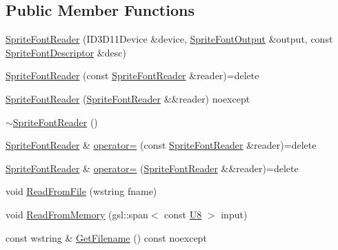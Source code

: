 \subsection*{Public Member Functions}
\begin{DoxyCompactItemize}
\item 
\mbox{\hyperlink{classmage_1_1rendering_1_1loader_1_1_sprite_font_reader_a5cef04ca33ef0047664fa757de6e1b8f}{Sprite\+Font\+Reader}} (I\+D3\+D11\+Device \&device, \mbox{\hyperlink{structmage_1_1rendering_1_1_sprite_font_output}{Sprite\+Font\+Output}} \&output, const \mbox{\hyperlink{classmage_1_1rendering_1_1_sprite_font_descriptor}{Sprite\+Font\+Descriptor}} \&desc)
\item 
\mbox{\hyperlink{classmage_1_1rendering_1_1loader_1_1_sprite_font_reader_a4c96a8d3554084baaf4b24f94a582ac6}{Sprite\+Font\+Reader}} (const \mbox{\hyperlink{classmage_1_1rendering_1_1loader_1_1_sprite_font_reader}{Sprite\+Font\+Reader}} \&reader)=delete
\item 
\mbox{\hyperlink{classmage_1_1rendering_1_1loader_1_1_sprite_font_reader_a71239906b4c7609747d5fe47189883b6}{Sprite\+Font\+Reader}} (\mbox{\hyperlink{classmage_1_1rendering_1_1loader_1_1_sprite_font_reader}{Sprite\+Font\+Reader}} \&\&reader) noexcept
\item 
\mbox{\hyperlink{classmage_1_1rendering_1_1loader_1_1_sprite_font_reader_a206d696476cd2ed6606932c549cd0c6c}{$\sim$\+Sprite\+Font\+Reader}} ()
\item 
\mbox{\hyperlink{classmage_1_1rendering_1_1loader_1_1_sprite_font_reader}{Sprite\+Font\+Reader}} \& \mbox{\hyperlink{classmage_1_1rendering_1_1loader_1_1_sprite_font_reader_a645988b6bba2a4fda93d18c4c9e3d09c}{operator=}} (const \mbox{\hyperlink{classmage_1_1rendering_1_1loader_1_1_sprite_font_reader}{Sprite\+Font\+Reader}} \&reader)=delete
\item 
\mbox{\hyperlink{classmage_1_1rendering_1_1loader_1_1_sprite_font_reader}{Sprite\+Font\+Reader}} \& \mbox{\hyperlink{classmage_1_1rendering_1_1loader_1_1_sprite_font_reader_ac6902b3475ae8425d475de59135a11a3}{operator=}} (\mbox{\hyperlink{classmage_1_1rendering_1_1loader_1_1_sprite_font_reader}{Sprite\+Font\+Reader}} \&\&reader)=delete
\item 
void \mbox{\hyperlink{classmage_1_1rendering_1_1loader_1_1_sprite_font_reader_a68db676feaa42c1c3a9bf16d0680b04f}{Read\+From\+File}} (wstring fname)
\item 
void \mbox{\hyperlink{classmage_1_1rendering_1_1loader_1_1_sprite_font_reader_afc48490dca5042078726a1ec3fe7abe7}{Read\+From\+Memory}} (gsl\+::span$<$ const \mbox{\hyperlink{namespacemage_afc638980bc6154f15af5e2d93a0e0ea9}{U8}} $>$ input)
\item 
const wstring \& \mbox{\hyperlink{classmage_1_1rendering_1_1loader_1_1_sprite_font_reader_a801558f27606dbc681809178aaaaacd1}{Get\+Filename}} () const noexcept
\end{DoxyCompactItemize}
